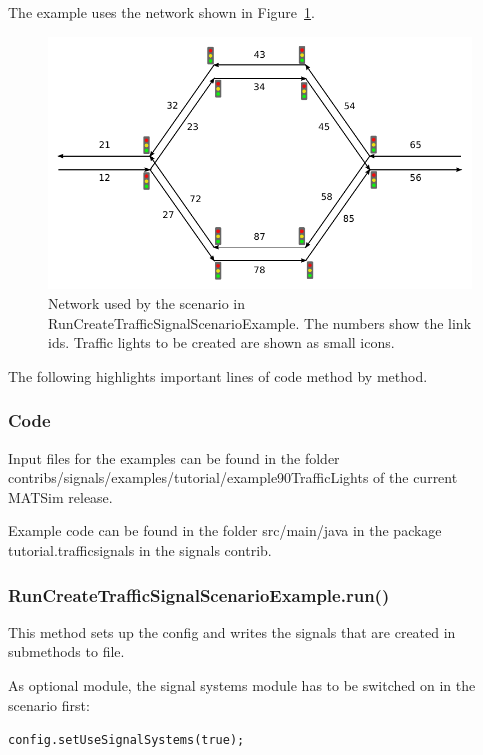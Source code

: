 The example uses the network shown in Figure~\ref{fig:RunCreateTrafficSignalScenarioExampleNetwork}. 

\begin{figure}[htbp]
	\includegraphics{data/RunCreateTrafficSignalScenarioExampleNetwork}
	\caption{Network used by the scenario in RunCreateTrafficSignalScenarioExample. The numbers show the link ids. Traffic lights to be created are shown as small icons.}
	\label{fig:RunCreateTrafficSignalScenarioExampleNetwork}
\end{figure}

The following highlights important lines of code method by method.

\subsubsection{Code}

Input files for the examples can be found in the folder  contribs/signals/examples/tutorial/example90TrafficLights of the current MATSim release.

Example code can be found in the folder src/main/java in the package tutorial.trafficsignals in the signals contrib.

\subsubsection{RunCreateTrafficSignalScenarioExample.run()}

This method sets up the config and writes the signals that are created in submethods to file.

As optional module, the signal systems module has to be switched on in the scenario first:


\texttt{\nolinebreak config.setUseSignalSystems(true);}

